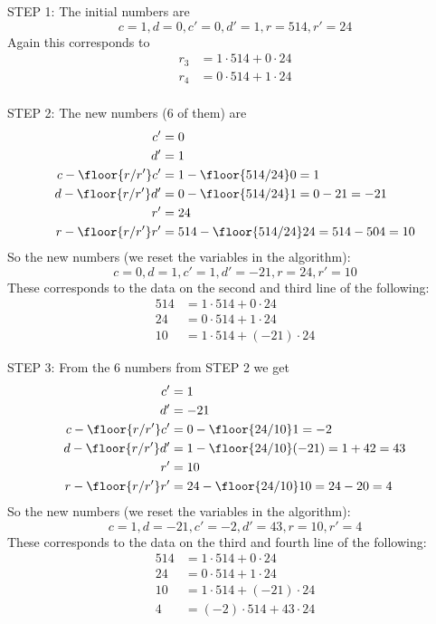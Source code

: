 STEP 1: The initial numbers are
\[
c=1, d=0, c'=0, d'=1, r=514, r'=24
\]
Again this corresponds to
\begin{align*}
r_3 &= 1 \cdot 514 + 0 \cdot 24  \\
r_4 &= 0 \cdot 514 + 1 \cdot 24 \\
\end{align*}

STEP 2: 
The new numbers (6 of them) are
\begin{align*}
 c' &=0 \\
 d' &=1 \\
 c - \floor{r/r'} c' &= 1 - \floor{514/24} 0 = 1\\
 d - \floor{r/r'}d' &= 0 - \floor{514/24}1 = 0 - 21 = -21 \\
 r' &= 24 \\ 
 r - \floor{r/r'}r' &= 514 - \floor{514/24}24 = 514 - 504 = 10
\end{align*}
So the new numbers (we reset the variables in the algorithm):
\[
c=0, d=1, c'=1, d'=-21, r=24, r'= 10
\]
These corresponds to the data on the second and third line of the following:
\begin{align*}
514 &= 1 \cdot 514 + 0 \cdot 24      \\
24  &= 0 \cdot 514 + 1 \cdot 24      \\
10  &= 1 \cdot 514 + (-21) \cdot 24 
\end{align*}

STEP 3: From the 6 numbers from STEP 2 we get
\begin{align*}
 c' &= 1 \\
 d' &= -21 \\
 c - \floor{r/r'} c' &= 0 - \floor{24/10} 1 = -2 \\
 d - \floor{r/r'}d'  &= 1 - \floor{24/10} (-21) = 1 + 42 = 43 \\
 r' &= 10 \\ 
 r - \floor{r/r'}r' &= 24 - \floor{24/10}10 = 24 - 20 = 4
\end{align*}
So the new numbers (we reset the variables in the algorithm):
\[
c=1, d=-21, c'=-2, d'= 43, r=10, r'= 4
\]
These corresponds to the data on the third and fourth line of the following:
\begin{align*}
514 &= 1 \cdot 514 + 0 \cdot 24     \\
24  &= 0 \cdot 514 + 1 \cdot 24     \\
10  &= 1 \cdot 514 + (-21) \cdot 24 \\
4   &= (-2) \cdot 514 + 43 \cdot 24 
\end{align*}

